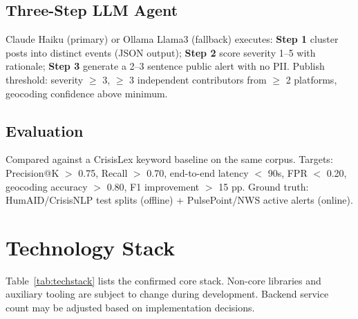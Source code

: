 \documentclass[conference]{IEEEtran}
\begin{document}
\subsection{Three-Step LLM Agent}

Claude Haiku (primary) or Ollama Llama3 (fallback) executes: \textbf{Step 1}
cluster posts into distinct events (JSON output); \textbf{Step 2} score
severity 1--5 with rationale; \textbf{Step 3} generate a 2--3 sentence public
alert with no PII. Publish threshold: severity $\geq$ 3, $\geq$ 3 independent
contributors from $\geq$ 2 platforms, geocoding confidence above minimum.

\subsection{Evaluation}

Compared against a CrisisLex keyword baseline on the same corpus. Targets:
Precision@K $>$ 0.75, Recall $>$ 0.70, end-to-end latency $<$ 90s, FPR $<$ 0.20,
geocoding accuracy $>$ 0.80, F1 improvement $>$ 15 pp. Ground truth:
HumAID/CrisisNLP test splits (offline) + PulsePoint/NWS active alerts (online).

\section{Technology Stack}

Table~\ref{tab:techstack} lists the confirmed core stack. Non-core libraries
and auxiliary tooling are subject to change during development. Backend service
count may be adjusted based on implementation decisions.
\end{document}
